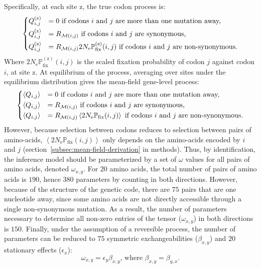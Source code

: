 \documentclass{article}
\newcommand{\Ne}{N_{\text{e}}}
\newcommand{\proba}{\mathbb{P}}
\newcommand{\Pfix}{2 \Ne \proba_{\text{fix}}}
\newcommand{\mutmatrix}{R}
\newcommand{\ci}{{i}}
\newcommand{\cj}{{j}}
\newcommand{\itoj}{\ci, \cj}
\newcommand{\nuc}{\mathcal{M}}
\newcommand{\nucitoj}{\nuc(\itoj)}
\newcommand{\submatrix}{Q}
\newcommand{\aaSource}{x}
\newcommand{\aaTarget}{y}
\newcommand{\AAexchan}{\beta}
\newcommand{\AAequi}{\epsilon}
\newcommand{\site}{\text{z}}
\newcommand{\siteexp}{^{(\site)}}
\begin{document}
Specifically, at each site $\site$, the true codon process is:
\begin{equation}
 \begin{dcases}
 \submatrix_{\itoj}\siteexp & = 0 \text{ if codons $\ci$ and $\cj$ are more than one mutation away,} \\
 \submatrix_{\itoj}\siteexp & = \mutmatrix_{\nucitoj} \text{ if codons $\ci$ and $\cj$ are {synonymous},} \\
 \submatrix_{\itoj}\siteexp & = \mutmatrix_{\nucitoj} \Pfix\siteexp(\itoj) \text{ if codons $\ci$ and $\cj$ are non-synonymous}.
 \end{dcases}
 \label{eq:codon-site-processs}
\end{equation}
Where $\Pfix\siteexp(\itoj)$ is the scaled fixation probability of codon $\cj$ against codon $\ci$, at site $\site$.
At equilibrium of the process, averaging over sites under the equilibrium distribution gives the mean-field gene-level process:
\begin{equation}
 \begin{dcases}
 \left\langle \submatrix_{\itoj} \right\rangle & = 0 \text{ if codons $\ci$ and $\cj$ are more than one mutation away,} \\
 \left\langle \submatrix_{\itoj} \right\rangle & = \mutmatrix_{\nucitoj} \text{ if codons $\ci$ and $\cj$ are {synonymous},} \\
 \left\langle \submatrix_{\itoj} \right\rangle & = \mutmatrix_{\nucitoj} \left\langle \Pfix (\itoj) \right\rangle \text{ if codons $\ci$ and $\cj$ are non-synonymous}.
 \end{dcases}
 \label{eq:codon-avg-process}
\end{equation}
However, because selection between codons reduces to selection between pairs of amino-acids, $\left\langle \Pfix (\itoj) \right\rangle$ only depends on the amino-acids encoded by $\ci$ and $\cj$ (section~\ref{subsec:mean-field-derivation} in methods).
Thus, by identification, the inference model should be parameterized by a set of $\omega$ values for all pairs of amino acids, denoted $\omega_{\aaSource, \aaTarget}$.
For $20$ amino acids, the total number of pairs of amino acids is $190$, hence $380$ parameters by counting in both directions.
However, because of the structure of the genetic code, there are $75$ pairs that are one nucleotide away, since some amino acids are not directly accessible through a single {non-synonymous} mutation.
As a result, the number of parameters necessary to determine all non-zero entries of the tensor ($\omega_{\aaSource, \aaTarget}$) in both directions is $150$.
Finally, under the assumption of a reversible process, the number of parameters can be reduced to $75$ symmetric exchangeabilities ($\AAexchan_{\aaSource, \aaTarget}$) and $20$ stationary effects ($\AAequi_{\aaSource}$):
\begin{equation}
 \omega_{\aaSource, \aaTarget} = \AAequi_{\aaTarget} \AAexchan_{\aaSource, \aaTarget}\text{, where } \AAexchan_{\aaSource, \aaTarget} = \AAexchan_{\aaTarget, \aaSource}.\label{eq:omega-reversible}
\end{equation}
\end{document}

